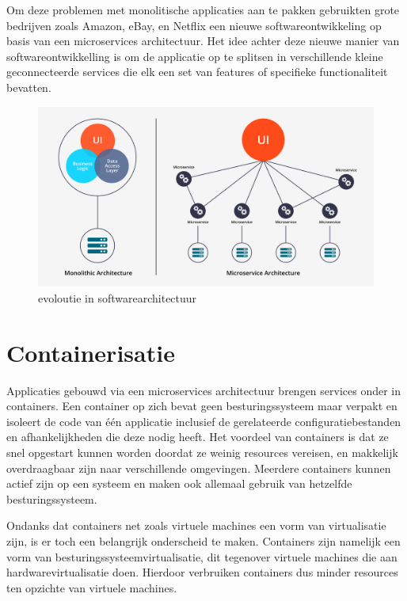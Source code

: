 Om deze problemen met monolitische applicaties aan te pakken gebruikten grote bedrijven zoals Amazon, eBay, en Netflix een nieuwe softwareontwikkeling op basis van een microservices architectuur. Het idee achter deze nieuwe manier van softwareontwikkelling is om de applicatie op te splitsen in verschillende kleine geconnecteerde services die elk een set van features of specifieke functionaliteit bevatten.

\begin{figure}[h]
    \centering
    \includegraphics[scale=.1]{img/monolithic_vs_microservices.png}
    \caption{evoloutie in softwarearchitectuur \autocite{Sanjaya2020}}
    \label{softwarearchitectuur}
\end{figure}

\section{Containerisatie}

Applicaties gebouwd via een microservices architectuur brengen services onder in containers. Een container op zich bevat geen besturingssysteem maar verpakt en isoleert de code van één applicatie inclusief de gerelateerde configuratiebestanden en afhankelijkheden die deze nodig heeft. Het voordeel van containers is dat ze snel opgestart kunnen worden doordat ze weinig resources vereisen, en makkelijk overdraagbaar zijn naar verschillende omgevingen. Meerdere containers kunnen actief zijn op een systeem en maken ook allemaal gebruik van hetzelfde besturingssysteem. \autocite{Singh2020}

Ondanks dat containers net zoals virtuele machines een vorm van virtualisatie zijn, is er toch een belangrijk onderscheid te maken. Containers zijn namelijk een vorm van besturingssysteemvirtualisatie, dit tegenover virtuele machines die aan hardwarevirtualisatie doen.
Hierdoor verbruiken containers dus minder resources ten opzichte van virtuele machines. \autocite{Holt2018}

